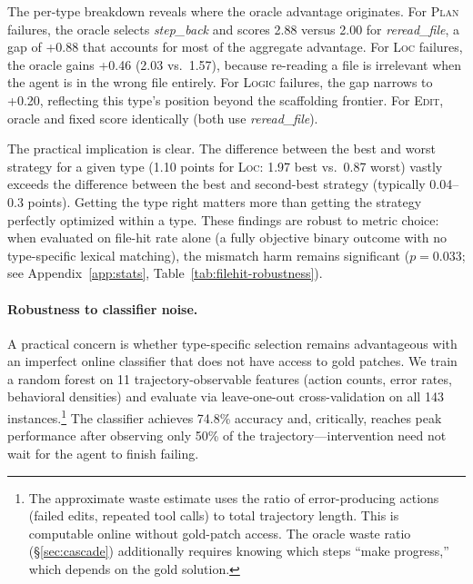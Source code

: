 \documentclass[11pt]{article}
\begin{document}
The per-type breakdown reveals where the oracle advantage originates.
For \textsc{Plan} failures, the oracle selects \textit{step\_back} and scores 2.88 versus 2.00 for \textit{reread\_file}, a gap of +0.88 that accounts for most of the aggregate advantage.
For \textsc{Loc} failures, the oracle gains +0.46 (2.03 vs.\ 1.57), because re-reading a file is irrelevant when the agent is in the wrong file entirely.
For \textsc{Logic} failures, the gap narrows to +0.20, reflecting this type's position beyond the scaffolding frontier.
For \textsc{Edit}, oracle and fixed score identically (both use \textit{reread\_file}).

The practical implication is clear.
The difference between the best and worst strategy for a given type (1.10 points for \textsc{Loc}: 1.97 best vs.\ 0.87 worst) vastly exceeds the difference between the best and second-best strategy (typically 0.04--0.3 points).
Getting the type right matters more than getting the strategy perfectly optimized within a type.
These findings are robust to metric choice: when evaluated on file-hit rate alone (a fully objective binary outcome with no type-specific lexical matching), the mismatch harm remains significant ($p=0.033$; see Appendix~\ref{app:stats}, Table~\ref{tab:filehit-robustness}).

\paragraph{Robustness to classifier noise.}
A practical concern is whether type-specific selection remains advantageous with an imperfect online classifier that does not have access to gold patches.
We train a random forest on 11 trajectory-observable features (action counts, error rates, behavioral densities) and evaluate via leave-one-out cross-validation on all 143 instances.\footnote{The approximate waste estimate uses the ratio of error-producing actions (failed edits, repeated tool calls) to total trajectory length. This is computable online without gold-patch access. The oracle waste ratio (\S\ref{sec:cascade}) additionally requires knowing which steps ``make progress,'' which depends on the gold solution.}
The classifier achieves 74.8\% accuracy and, critically, reaches peak performance after observing only 50\% of the trajectory---intervention need not wait for the agent to finish failing.
\end{document}
